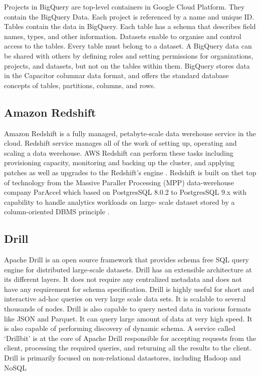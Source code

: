      Projects in BigQuery \cite{www-bigquery-documentation} are
     top-level containers in Google Cloud Platform. They contain the
     BigQuery Data. Each project is referenced by a name and
     unique ID. Tables contain the data in BigQuery. Each table has a
     schema that describes field names, types, and other
     information. Datasets enable to organise and control access to
     the tables. Every table must belong to a dataset. A BigQuery data
     can be shared with others by defining roles and setting
     permissions for organizations, projects, and datasets, but not on
     the tables within them. BigQuery stores data in the
     \cite{www-bigquery-columnar-storage} Capacitor columnar data
     format, and offers the standard database concepts of tables,
     partitions, columns, and rows.

     
\subsection{Amazon Redshift}
     
     Amazon Redshift is a fully managed, petabyte-scale data werehouse
     service in the cloud. Redshift service manages all of the work of
     setting up, operating and scaling a data werehouse. AWS Redshift
     can perform these tasks including provisioning capacity,
     monitoring and backing up the cluster, and applying patches as
     well as upgrades to the Redshift's engine \cite{www-redshift}.
     Redshift is built on thet top of technology from the Massive
     Paraller Processing (MPP) data-werehouse company ParAccel which
     based on PostgresSQL 8.0.2 to PostgresSQL 9.x with capability to
     handle analytics workloads on large- scale dataset stored by a
     column-oriented DBMS principle \cite{www-wiki-red}.

\subsection{Drill}

     Apache Drill \cite{www-ApacheDrill} is an open source framework
     that provides schema free SQL query engine for distributed 
     large-scale datasets. Drill has an extensible architecture at 
     its different layers. It does not require any centralized 
     metadata and does not have any requirement for schema 
     specification. Drill is highly useful for short and interactive
     ad-hoc queries on very large scale data sets. It is scalable to
     several thousands of nodes. Drill is also capable to query 
     nested data in various formats like JSON and Parquet. It can 
     query large amount of data at very high speed. It is also  
     capable of performing discovery of dynamic schema. 
     A service called ‘Drillbit’  is at the core of Apache Drill 
     responsible for accepting requests from the client, processing
     the required queries, and returning all the results to the client.
     Drill is primarily focused on non-relational datastores, 
     including Hadoop and NoSQL

